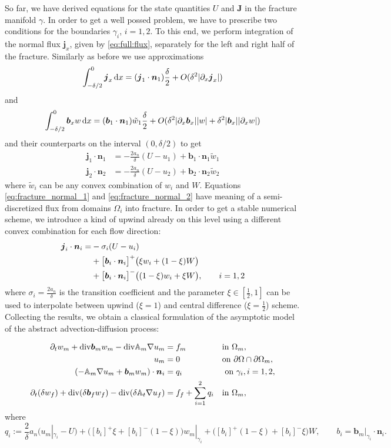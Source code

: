 \documentclass[a4paper]{article}
\def\prtl{\partial}
\def\vc#1{\mathbf{\boldsymbol{#1}}}     %
\def\tn#1{{\mathbb{#1}}}    %
\def\abs#1{\lvert#1\rvert}
\def\div{{\rm div}}
\def\grad{\nabla}
\def\d {\,{\rm d}}
\begin{document}
So far, we have derived equations for the state quantities $U$ and $\vc J$ in the fracture manifold $\gamma$. In order to
get a well possed problem, we have to prescribe two conditions for the boundaries $\gamma_i$, $i=1,2$. To this end, we
perform integration of the normal flux $\vc j_x$, given by \eqref{eq:full:flux}, separately for the left and right half of the fracture.
Similarly as before we use approximations
\[
 \int_{-\delta/2}^0 \vc j_x \d x = (\vc j_1 \cdot \vc n_1)\frac{\delta}{2} + O(\delta^2 \abs{\prtl_x \vc j_x})
\]
and 
\[
 \int_{-\delta/2}^0 \vc b_x w \d x = (\vc b_1 \cdot \vc n_1)\tilde{w}_1\frac{\delta}{2} + O(\delta^2 \abs{\prtl_x \vc b_x}\abs{w} + \delta^2\abs{\vc b_x}\abs{\prtl_x w})
\]
and their counterparts on the interval $(0,\delta/2)$ to get
\begin{align}
    \label{eq:fracture_normal_1}
     \vc j_1 \cdot \vc n_1 &= -\frac{2a_n}{\delta} (U - u_1) + \vc b_1\cdot \vc n_1 \tilde{w}_1\\
    \label{eq:fracture_normal_2}
    \vc j_2 \cdot \vc n_2 &= -\frac{2a_n}{\delta} (U - u_2) + \vc b_2\cdot \vc n_2 \tilde{w}_2
\end{align}
where $\tilde w_i$ can be any convex combination of $w_i$ and $W$. Equations \eqref{eq:fracture_normal_1}  
and \eqref{eq:fracture_normal_2} have meaning of a semi-discretized flux from domains $\Omega_i$ into fracture.
In order to get a stable numerical scheme, we introduce a kind of upwind already on this level using a different convex 
combination for each flow direction:
\begin{align}
   \notag 
   \vc j_i \cdot \vc n_i
       = &-\sigma_i (U - u_i)      \\ 
   \notag
      &+ \big[\vc b_i\cdot \vc n_i\big]^{+} \big(\xi w_i + (1-\xi) W\big)       \\
      \label{eq:fracture_normal}
      &+ \big[\vc b_i\cdot \vc n_i\big]^{-} \big((1-\xi) w_i + \xi W\big), \qquad i=1,2
\end{align}
where $\sigma_i = \frac{2a_n}{\delta}$ is the transition coefficient and the parameter $\xi\in [\frac12, 1]$ can be used to interpolate
between upwind ($\xi = 1$) and central difference ($\xi=\frac12$) scheme. Collecting the results, we obtain a classical formulation of 
the asymptotic model of the abstract advection-diffusion process:

\begin{align}
  \label{eq:fr:continuity}
  \prtl_t w_m + \div \vc b_m w_m - \div \tn A_m \grad u_m &= f_m&&  \text{in } \Omega_m,\\
  \label{eq:fr:Dirichlet}
  u_m &= 0&& \text{on } \partial\Omega\cap\partial\Omega_m,\\
  (- \tn A_m\grad u_m + \vc b_m w_m) \cdot \vc n_i &= q_i &&\mbox{ on }\gamma_i,i=1,2,\\ 
  \prtl_t(\delta w_f)  + \div(\delta \vc b_f w_f ) - \div( \delta \tn A_t \grad u_f) 
      &= f_f + \sum_{i=1}^2 q_i&&  \text{in } \Omega_m,\\
\end{align}
where 
\[
    q_i:=\frac2\delta a_n(u_m|_{\gamma_i} - U) 
    +  \big([b_i]^{+}\xi + [b_i]^{-}(1-\xi)\big) w_m|_{\gamma_i}
    +  \big([b_i]^{+}(1-\xi) + [b_i]^{-}\xi\big) W,
    \qquad b_i = \vc b_m |_{\gamma_i} \cdot \vc n_i.
\]
\end{document}
